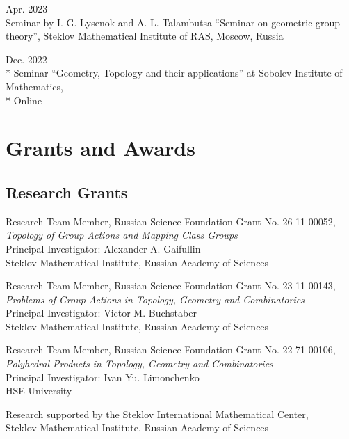 \documentclass[11pt,letterpaper]{report}
\begin{document}
\begin{tablist}
       \item{Apr. 2023} \\ Seminar by I. G. Lysenok and A. L. Talambutsa ``Seminar on geometric group theory'', Steklov Mathematical Institute of RAS, Moscow, Russia
       
       \item{Dec. 2022} \\* Seminar ``Geometry, Topology and their applications'' at Sobolev Institute of Mathematics,\\* Online
       
      
    \end{tablist}

    
    
    
    
     \section*{Grants and Awards}

    \subsection*{Research Grants}

    \begin{tablist}

        \item[2026 -- present] \tab{}Research Team Member, Russian Science Foundation Grant No. 26-11-00052,\\
        {\it Topology of Group Actions and Mapping Class Groups}\\
        Principal Investigator: Alexander A. Gaifullin\\
        Steklov Mathematical Institute, Russian Academy of Sciences

        \item[2023 -- 2025] \tab{}Research Team Member, Russian Science Foundation Grant No. 23-11-00143,\\
        {\it Problems of Group Actions in Topology, Geometry and Combinatorics}\\
        Principal Investigator: Victor M. Buchstaber\\
        Steklov Mathematical Institute, Russian Academy of Sciences

        \item[2022] \tab{}Research Team Member, Russian Science Foundation Grant No. 22-71-00106,\\
        {\it Polyhedral Products in Topology, Geometry and Combinatorics}\\
        Principal Investigator: Ivan Yu. Limonchenko\\
        HSE University
        
        \item[2022 -- 2026] \tab{}Research supported by the Steklov International Mathematical Center,\\
        Steklov Mathematical Institute, Russian Academy of Sciences

    \end{tablist}
\end{document}
